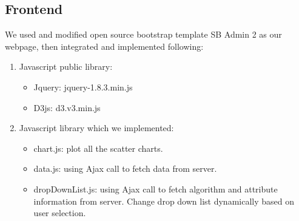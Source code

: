 \documentclass[11pt,letter]{article}
\begin{document}
\subsection {Frontend}
We used and modified open source bootstrap template SB Admin 2 \cite{sb_admin_2} as our webpage, then integrated and implemented following:
\begin{enumerate}
\item Javascript public library:
\begin{itemize}
\item Jquery: jquery-1.8.3.min.js
\item D3js: d3.v3.min.js \cite{d3_scatterplot}
\end{itemize}

\item Javascript library which we implemented:
\begin{itemize}
\item chart.js:  plot all the scatter charts.
\item data.js: using Ajax call to fetch data from server.
\item dropDownList.js: using Ajax call to fetch algorithm and attribute information from server. Change drop down list dynamically based on user selection.
\end{itemize}

\end{enumerate}
\end{document}
